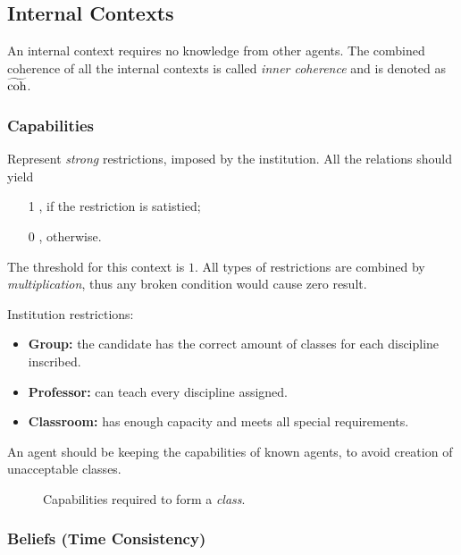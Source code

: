 \subsection{Internal Contexts}

An internal context requires no knowledge from other agents.
The combined coherence of all the internal contexts is called
\emph{inner coherence} and is denoted as $\mathrm{\widetilde{coh}}$.

\subsubsection{Capabilities}

Represent \emph{strong} restrictions, imposed by the institution.
All the relations should yield
\begin{itemize}
  \item [1], if the restriction is satistied;
  \item [0], otherwise.
\end{itemize}

The threshold for this context is $1$.
All types of restrictions are combined by \emph{multiplication}, thus
any broken condition would cause zero result.


Institution restrictions:
\begin{itemize}
\item \textbf{Group:} the candidate has the correct amount of classes for each
  discipline inscribed.
\item \textbf{Professor:} can teach every discipline assigned.
\item \textbf{Classroom:} has enough capacity and meets all special requirements.
\end{itemize}

An agent should be keeping the capabilities of known agents, to avoid creation
of unacceptable classes.

\begin{figure}[h]
  \centering
  
  \caption{Capabilities required to form a \emph{class}.}
  \label{fig:capabilities}
\end{figure}


\subsubsection{Beliefs (Time Consistency)}

